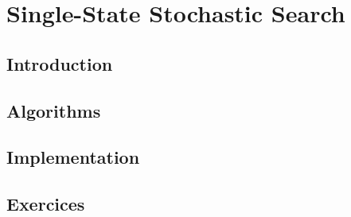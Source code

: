 \chapter{Single-State Stochastic Search}\label{cap:single}

\section{Introduction}


\section{Algorithms}

\section{Implementation}

\section{Exercices}

